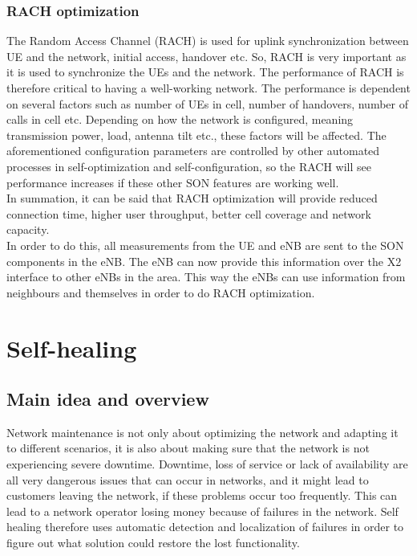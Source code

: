 \documentclass{report}
\begin{document}
\subsection{RACH optimization}
The Random Access Channel (RACH) is used for uplink synchronization between UE and the network, initial access, handover etc. So, RACH is very important as it is used to synchronize the UEs and the network. 
The performance of RACH is therefore critical to having a well-working network. The performance is dependent on several factors such as number of UEs in cell, number of handovers, number of calls in cell etc. 
Depending on how the network is configured, meaning transmission power, load, antenna tilt etc., these factors will be affected.\cite{Feng2008} The aforementioned configuration parameters are controlled by other automated processes in self-optimization and self-configuration, so the RACH will see performance increases if these other SON features are working well. \\ In summation, it can be said that RACH optimization will provide reduced connection time, higher user throughput, better cell coverage and network capacity. \\ In order to do this, all measurements from the UE and eNB are sent to the SON components in the eNB. The eNB can now provide this information over the X2 interface to other eNBs in the area. This way the eNBs can use information from neighbours and themselves in order to do RACH optimization. \cite{Atayero2014}


\chapter{Self-healing}
\section{Main idea and overview}
Network maintenance is not only about optimizing the network and adapting it to different scenarios, it is also about making sure that the network is not experiencing severe downtime. Downtime, loss of service or lack of availability are all very dangerous issues that can occur in networks, and it might lead to customers leaving the network, if these problems occur too frequently. This can lead to a network operator losing money because of failures in the network. Self healing therefore uses automatic detection and localization of failures in order to figure out what solution could restore the lost functionality. 
\end{document}
